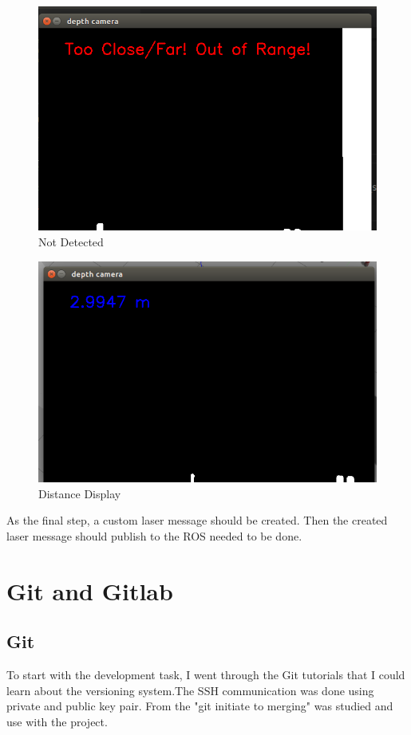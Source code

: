 \documentclass[twoside,12pt,times,onecolumn,a4paper]{report}
\begin{document}
\begin{figure}[H]
  \centering
   \includegraphics[width=15cm]{depth_output}
  \caption{Not Detected}
\end{figure}

\begin{figure}[H]
  \centering
   \includegraphics[width=15cm]{depth-out-dist}
  \caption{Distance Display}
\end{figure}

As the final step, a custom laser message should be created. Then the created laser 
message should publish to the ROS needed to be done.

\section{ Git and Gitlab}

\subsection{Git}
To start with the development task, I went through the Git tutorials that I could learn about the versioning system.The SSH communication was done using private and public key pair.  From the "git initiate to merging" was studied and use with the project. 
\end{document}
